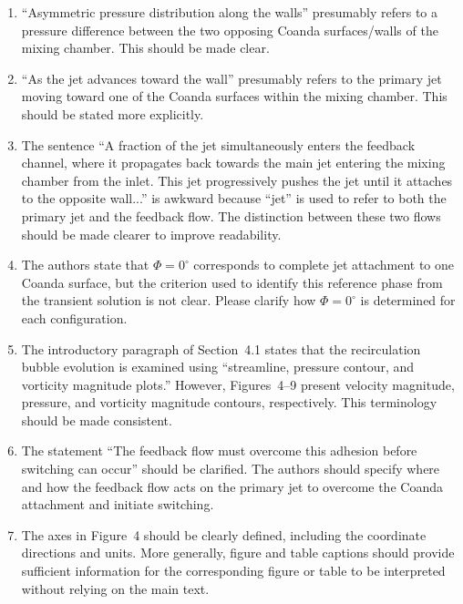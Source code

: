 \documentclass[11pt]{article}
\begin{document}
	\begin{enumerate}
		
		\item ``Asymmetric pressure distribution along the walls'' presumably refers to a pressure difference between the two opposing Coanda surfaces/walls of the mixing chamber. This should be made clear.
		
		\item ``As the jet advances toward the wall'' presumably refers to the primary jet moving toward one of the Coanda surfaces within the mixing chamber. This should be stated more explicitly.
		
		\item The sentence ``A fraction of the jet simultaneously enters the feedback channel, where it propagates back towards the main jet entering the mixing chamber from the inlet. This jet progressively pushes the jet until it attaches to the opposite wall...'' is awkward because ``jet'' is used to refer to both the primary jet and the feedback flow. The distinction between these two flows should be made clearer to improve readability.
		
		\item The authors state that $\Phi=0^\circ$ corresponds to complete jet attachment to one Coanda surface, but the criterion used to identify this reference phase from the transient solution is not clear. Please clarify how $\Phi=0^\circ$ is determined for each configuration.
		
		\item The introductory paragraph of Section~4.1 states that the recirculation bubble evolution is examined using ``streamline, pressure contour, and vorticity magnitude plots.'' However, Figures~4--9 present velocity magnitude, pressure, and vorticity magnitude contours, respectively. This terminology should be made consistent.
		
		\item The statement ``The feedback flow must overcome this adhesion before switching can occur'' should be clarified. The authors should specify where and how the feedback flow acts on the primary jet to overcome the Coanda attachment and initiate switching.
		
		\item The axes in Figure~4 should be clearly defined, including the coordinate directions and units. More generally, figure and table captions should provide sufficient information for the corresponding figure or table to be interpreted without relying on the main text.
		

\end{enumerate}
\end{document}

